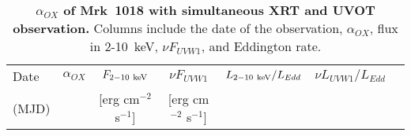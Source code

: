 
\begin{table}
\centering
\caption{{\bf $\alpha_{OX}$ of Mrk~1018 with simultaneous XRT and UVOT observation.} Columns include the date of the observation, $\alpha_{OX}$, flux in 2-10~keV, $\nu F_{UVW1}$, and Eddington rate.}
\label{tab:tablealpha_ox}
\begin{tabular}{lcccccc}
\hline
\hline
 
 Date &   $\alpha_{OX}$  & $F_{\rm{2-10~keV}}$  &$\nu F_{UVW1}$  & $L_{\rm{2-10~keV}}/L_{Edd}$ &   $\nu L_{UVW1}/L_{Edd}$  \\ 
 (MJD)&                   &   [erg cm$^{-2}$ s$^{-1}$]   &[erg cm$^{-2}$ s$^{-1}$]    &                    &            
 \\ \hline

 \hline
\end{tabular}   
\end{table}



\begin{comment}
\begin{table}
\centering
\caption{{\bf Host galaxy contribution and SED in UV band.} Columns include the band, spectrum, and date or contribution from host galaxy. Data come from \citet{2018MNRAS.480.3898N}.}
\label{tab:host_contribution}
\begin{tabular}{llllllll}
\hline
\hline
band & v & b & u & uw1 & um2 & uw2 & Note \\ 
Energy     & (2.26eV) & (2.8eV) & (3.5eV) & (4.7eV) & (5.5eV) & (6.4eV) \\ \hline
host & 1.33E-02 & 9.50E-03 & 2.65E-03 & 6.56E-04 & 4.00E-04 & 4.00E-04 &  \\ 
2008.08 & 1.00E-02 & 1.30E-02 & 1.64E-02 & 2.15E-02 & 2.38E-02 & 2.60E-02 &  \\ 
2013 & 1.20E-03 & 1.50E-03 & 1.79E-03 & 2.12E-03 & 2.27E-03 & 2.40E-03 &  \\ 
2016 & 4.70E-04 & 5.00E-04 & 5.16E-04 & 5.00E-04 & 4.80E-04 & 4.60E-04 &  \\  \hline
\end{tabular}   
\end{table}
\end{comment}


